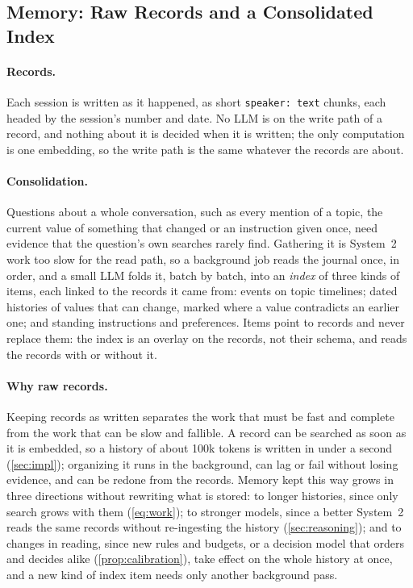 \subsection{Memory: Raw Records and a Consolidated Index}
\label{sec:memory}

\paragraph{Records.}
Each session is written as it happened, as short \texttt{speaker: text} chunks, each headed by the session's number and date.
No LLM is on the write path of a record, and nothing about it is decided when it is written; the only computation is one embedding, so the write path is the same whatever the records are about.

\paragraph{Consolidation.}
Questions about a whole conversation, such as every mention of a topic, the current value of something that changed or an instruction given once, need evidence that the question's own searches rarely find.
Gathering it is System~2 work too slow for the read path, so a background job reads the journal once, in order, and a small LLM folds it, batch by batch, into an \emph{index} of three kinds of items, each linked to the records it came from: events on topic timelines; dated histories of values that can change, marked where a value contradicts an earlier one; and standing instructions and preferences.
Items point to records and never replace them: the index is an overlay on the records, not their schema, and \sys{} reads the records with or without it.

\paragraph{Why raw records.}
Keeping records as written separates the work that must be fast and complete from the work that can be slow and fallible.
A record can be searched as soon as it is embedded, so a history of about 100k tokens is written in under a second (\cref{sec:impl}); organizing it runs in the background, can lag or fail without losing evidence, and can be redone from the records.
Memory kept this way grows in three directions without rewriting what is stored: to longer histories, since only search grows with them (\cref{eq:work}); to stronger models, since a better System~2 reads the same records without re-ingesting the history (\cref{sec:reasoning}); and to changes in reading, since new rules and budgets, or a decision model that orders and decides alike (\cref{prop:calibration}), take effect on the whole history at once, and a new kind of index item needs only another background pass.

